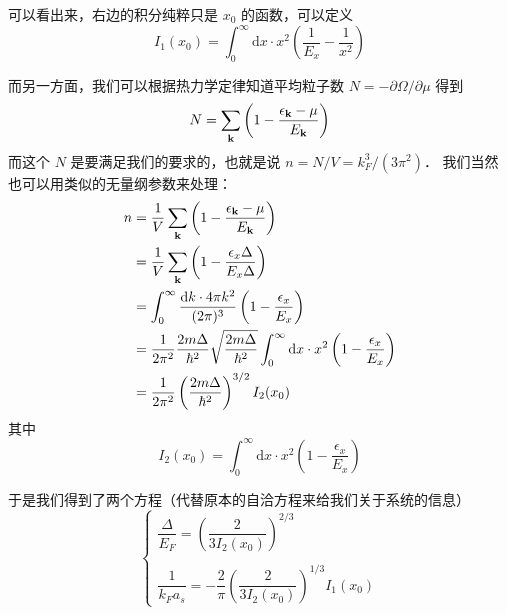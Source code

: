 可以看出来，右边的积分纯粹只是 $x_0$ 的函数，可以定义
\begin{equation}
I_1(x_0) = \int_0^\infty \text{d}x\cdot x^2\left(\frac{1}{E_x}-\frac{1}{x^2}\right)
\end{equation}

而另一方面，我们可以根据热力学定律知道平均粒子数 $N=-\partial\Omega/\partial\mu$ 得到
\begin{equation}
N = \sum_{\bf k}\left(1-\frac{\epsilon_{\bf k}-\mu}{E_{\bf k}}\right)
\end{equation}
而这个 $N$ 是要满足我们的要求的，也就是说 $n=N/V=k_F^3/(3\pi^2)$． 我们当然也可以用类似的无量纲参数来处理：
\begin{equation}
\begin{split}
n &= \frac{1}{V}\sum_{\bf k}\left(1-\frac{\epsilon_{\bf k}-\mu}{E_{\bf k}}\right)\\
&=\frac{1}{V}\sum_{\bf k}\left(1-\frac{\epsilon_x{\Delta}}{E_x{\Delta}}\right)\\ %
&=\int_0^\infty\frac{\text{d}k \cdot 4\pi k^2}{(2\pi)^3}\left(1-\frac{\epsilon_x}{E_x}\right)\\
&=\frac{1}{2\pi^2}\frac{2m\Delta}{\hbar^2}\sqrt{\frac{2m\Delta}{\hbar^2}}\int_0^\infty\text{d}x\cdot x^2\left(1-\frac{\epsilon_x}{E_x}\right)\\
&=\frac{1}{2\pi^2}\left(\frac{2m\Delta}{\hbar^2}\right)^{3/2}I_2(x_0)
\end{split}
\end{equation}
其中
\begin{equation}
I_2(x_0)=\int_0^\infty \text{d}x\cdot x^2\left(1-\frac{\epsilon_x}{E_x}\right)
\end{equation}

于是我们得到了两个方程（代替原本的自洽方程来给我们关于系统的信息）
\begin{equation}
\begin{cases}
\dfrac{\Delta}{E_F} = \left(\dfrac{2}{3I_2(x_0)}\right)^{2/3}\\
\ \\
\dfrac{1}{k_Fa_s} = -\dfrac{2}{\pi}\left(\dfrac{2}{3I_2(x_0)}\right)^{1/3}I_1(x_0)
\end{cases}
\end{equation}

